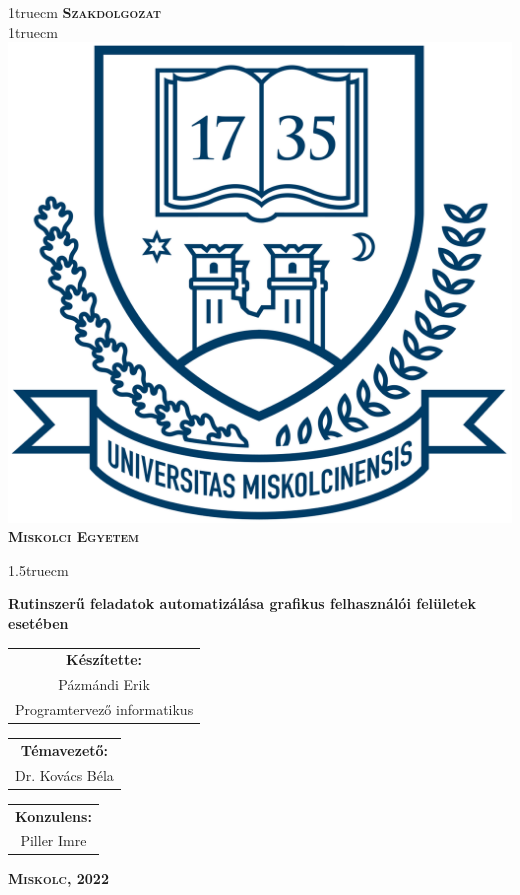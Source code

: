 \pagestyle{empty}

{\large
\begin{center}
\vglue 1truecm
\textbf{\huge\textsc{Szakdolgozat}}\\
\vglue 1truecm
\includegraphics[width=4.8truecm, height=4truecm]{images/me_logo.png}\\
\textbf{\textsc{Miskolci Egyetem}}
\end{center}}

\vglue 1.5truecm

{\LARGE
\begin{center}
\textbf{Rutinszerű feladatok automatizálása grafikus felhasználói felületek esetében}
\end{center}}

\vspace*{2.5truecm}
{\large
\begin{center}
\begin{tabular}{c}
\textbf{Készítette:}\\
Pázmándi Erik\\
Programtervező informatikus
\end{tabular}
\end{center}
\begin{center}
\begin{tabular}{c}
\textbf{Témavezető:}\\
Dr. Kovács Béla
\end{tabular}
\end{center}
\begin{center}
\begin{tabular}{c}
\textbf{Konzulens:}\\
Piller Imre
\end{tabular}
\end{center}}
\vfill

{\large
\begin{center}
\textbf{\textsc{Miskolc, 2022}}
\end{center}}

\newpage
